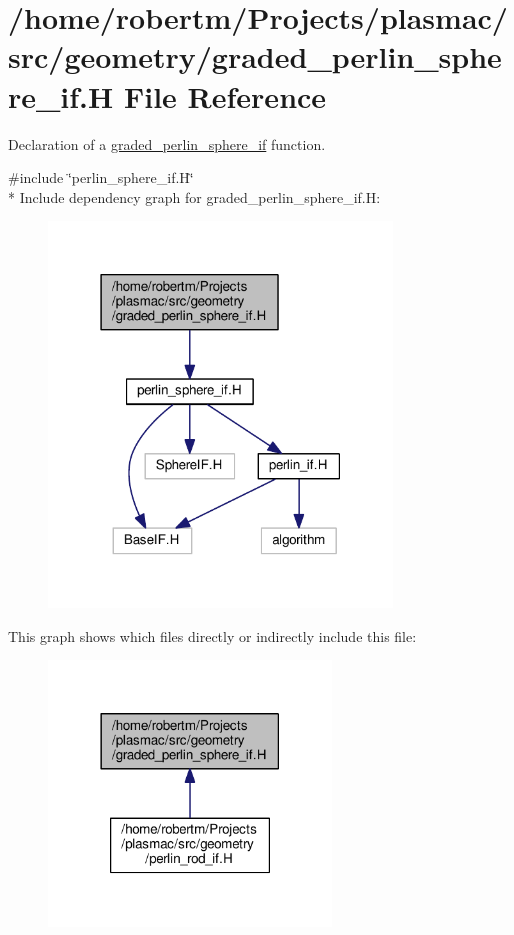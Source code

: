 \hypertarget{graded__perlin__sphere__if_8H}{}\section{/home/robertm/\+Projects/plasmac/src/geometry/graded\+\_\+perlin\+\_\+sphere\+\_\+if.H File Reference}
\label{graded__perlin__sphere__if_8H}


Declaration of a \hyperlink{classgraded__perlin__sphere__if}{graded\+\_\+perlin\+\_\+sphere\+\_\+if} function.  


{\ttfamily \#include \char`\"{}perlin\+\_\+sphere\+\_\+if.\+H\char`\"{}}\\*
Include dependency graph for graded\+\_\+perlin\+\_\+sphere\+\_\+if.\+H\+:\nopagebreak
\begin{figure}[H]
\begin{center}
\leavevmode
\includegraphics[width=259pt]{graded__perlin__sphere__if_8H__incl}
\end{center}
\end{figure}
This graph shows which files directly or indirectly include this file\+:\nopagebreak
\begin{figure}[H]
\begin{center}
\leavevmode
\includegraphics[width=213pt]{graded__perlin__sphere__if_8H__dep__incl}
\end{center}
\end{figure}
